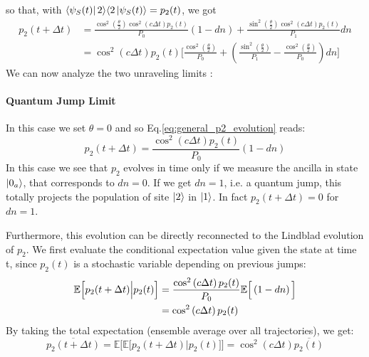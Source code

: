 \documentclass[a4paper,12pt]{article}
\begin{document}
so that, with $ \bra{\psi_{S}(t)} 2 \rangle \langle 2 \ket{\psi_{S}(t)} = p_{2} (t) $, we got 
\begin{align}
	p_{2} \left( t + \Delta t \right) &= \frac{\cos^{2} \left( \frac{\theta}{2} \right) \cos^{2} \left( c \Delta t \right) p_{2} (t)}{P_{0}} (1-dn) + \frac{\sin^{2} \left( \frac{\theta}{2} \right) \cos^{2} \left( c \Delta t \right) p_{2} (t)}{P_{1}} dn \\
	&=  \cos^{2} \left( c \Delta t \right) p_{2} (t) \Big[ \frac{\cos^{2} \left( \frac{\theta}{2} \right)}{P_{0}} + \left( \frac{\sin^{2} \left( \frac{\theta}{2} \right)}{P_{1}} - \frac{\cos^{2} \left( \frac{\theta}{2} \right)}{P_{0}} \right) dn \Big] \label{eq:general_p2_evolution}
\end{align}
We can now analyze the two unraveling limits : 
\paragraph{Quantum Jump Limit}
In this case we set $ \theta = 0 $ and so Eq.\ref{eq:general_p2_evolution} reads: 
\begin{equation}
	p_{2} \left( t + \Delta t \right) = \frac{\cos^{2} \left( c \Delta t \right) p_{2} (t) }{P_0} \left(1 - dn \right)
	\label{eq:QJ_p2_evolution}
\end{equation}
In this case we see that $ p_2 $ evolves in time only if we measure the ancilla in state $ \ket{0_{a}} $, that corresponds to $ dn = 0 $. If we get $ dn = 1 $, i.e. a quantum jump, this totally projects the population of site $ \ket{2} $ in $ \ket{1} $. In fact $ p_{2} \left( t + \Delta t \right) = 0 $ for $ dn = 1 $.

Furthermore, this evolution can be directly reconnected to the Lindblad evolution of $ p_2 $. 
We first evaluate the conditional expectation value given the state at time t, 
since $p_2(t)$ is a stochastic variable depending on previous jumps:
\begin{align}
	\mathbb{E} \Big[ p_{2}(t + \Delta t) \Big| p_{2}(t) \Big] &= \frac{\cos^{2} \left( c \Delta t \right) p_{2} (t) }{P_0} \mathbb{E} \Big[\left(1 - dn \right)\Big] \notag \\ 
	&= \cos^{2} \left( c \Delta t \right) p_{2} (t)
\end{align}
By taking the total expectation (ensemble average over all trajectories), we get:
\begin{equation}
	\overline{p_{2} \left( t + \Delta t \right) } = \mathbb{E} \Big[ \mathbb{E} \big[ p_{2}(t + \Delta t) \big| p_{2}(t) \big] \Big] = \cos^{2} \left( c \Delta t \right) \overline{ p_{2} (t)}
\end{equation}
\end{document}
